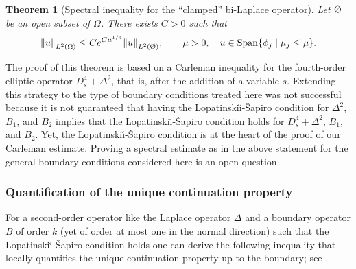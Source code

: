 \documentclass[JEP,XML,SOM,Unicode,published]{cedram}
\let\oldO\O
\renewcommand{\O}{\textup{\oldO}}
\let\sep\mid
\theoremstyle{plain}
\newtheorem{theorem}{Theorem}[section]
\theoremstyle{definition}
\newcommand{\LS}{Lopatinski\u{\i}-\v{S}apiro\xspace}
\newcommand{\Norm}[2]{{\| #1 \|}_{#2}}
\DeclareMathOperator{\Span}{Span}
\begin{document}
\begin{theorem}[Spectral inequality for the ``clamped'' bi-Laplace
operator]
\label{theorem: spectral inequality}
Let $\O$ be an open subset of $\Omega$.
There exists $C>0$ such that
\begin{equation*}
\Norm{u}{L^2(\Omega)} \leq C e^{C \mu^{1/4}}
\Norm{u}{L^2(\O)}, \qquad \mu >0, \quad u \in \Span \{\phi_j\sep \mu_j \leq \mu\}.
\end{equation*}
\end{theorem}
The proof of this theorem is based on a Carleman inequality for the
fourth-order elliptic operator $D_s^4 + \Delta^2$, that is, after the
addition of a variable $s$. Extending this strategy to the type of
boundary conditions treated here was not successful because it is not
guaranteed that having the \LS condition for $\Delta^2$, $B_1$, and
$B_2$ implies that the \LS condition holds for $D_s^4 +\Delta^2$, $B_1$, and
$B_2$. Yet, the \LS condition is at the heart of the proof of our
Carleman estimate. Proving a spectral estimate as in the above
statement for the general boundary conditions considered here is
an open question.

\subsubsection{Quantification of the unique continuation property}

For a second-order operator like the Laplace operator $\Delta$ and a
boundary operator $B$ of order $k$ (yet of order at most one in the
normal direction) such that the \LS condition holds one can derive the
following inequality that locally quantifies the unique continuation property
up to the boundary; see \cite[Lem.\,9.2]{JGL-vol1}.
\end{document}
